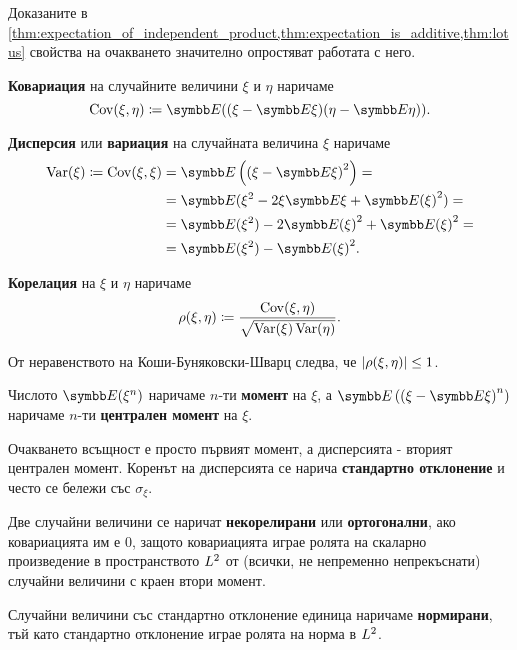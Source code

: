 \documentclass[
  headings=standardclasses,
  bibliography=totocnumbered,
]{scrartcl}
\begin{document}
Доказаните в \cref{thm:expectation_of_independent_product,thm:expectation_is_additive,thm:lotus} свойства на очакването значително опростяват работата с него.

\begin{definition}
  \textbf{Ковариация} на случайните величини \( \xi \) и \( \eta \) наричаме
  \begin{equation*}
    \Cov(\xi, \eta)
    \coloneqq
    \Expect((\xi - \Expect \xi) (\eta - \Expect \eta)).
  \end{equation*}

  \textbf{Дисперсия} или \textbf{вариация} на случайната величина \( \xi \) наричаме
  \begin{align*}
    \Var(\xi)
    \coloneqq
    \Cov(\xi, \xi)
    &=
    \Expect \left({(\xi - \Expect \xi)}^2 \right)
    = \\ &=
    \Expect(\xi^2 - 2 \xi \Expect \xi + {\Expect(\xi)}^2)
    = \\ &=
    \Expect(\xi^2) - 2 {\Expect(\xi)}^2 + {\Expect(\xi)}^2
    = \\ &=
    \Expect(\xi^2) - {\Expect(\xi)}^2.
  \end{align*}

  \textbf{Корелация} на \( \xi \) и \( \eta \) наричаме
  \begin{equation*}
    \operatorname{\rho}(\xi, \eta)
    \coloneqq
    \frac {\operatorname{Cov}(\xi, \eta)} {\sqrt{\operatorname{Var}(\xi) \operatorname{Var}(\eta)}}.
  \end{equation*}

  От неравенството на Коши-Буняковски-Шварц следва, че \( \left\vert \operatorname{\rho}(\xi, \eta) \right\vert \leq 1 \).

  Числото \( \Expect(\xi^n) \) наричаме \( n \)-ти \textbf{момент} на \( \xi \), а \( \Expect \left( {(\xi - \Expect \xi)}^n \right) \) наричаме \( n \)-ти \textbf{централен момент} на \( \xi \).

  Очакването всъщност е просто първият момент, а дисперсията - вторият централен момент. Коренът на дисперсията се нарича \textbf{стандартно отклонение} и често се бележи със \( \sigma_\xi \).

  Две случайни величини се наричат \textbf{некорелирани} или \textbf{ортогонални}, ако ковариацията им е \( 0 \), защото ковариацията играе ролята на скаларно произведение в пространството \( L^2 \) от (всички, не непременно непрекъснати) случайни величини с краен втори момент.

  Случайни величини със стандартно отклонение единица наричаме \textbf{нормирани}, тъй като стандартно отклонение играе ролята на норма в \( L^2 \).
\end{definition}
\end{document}
